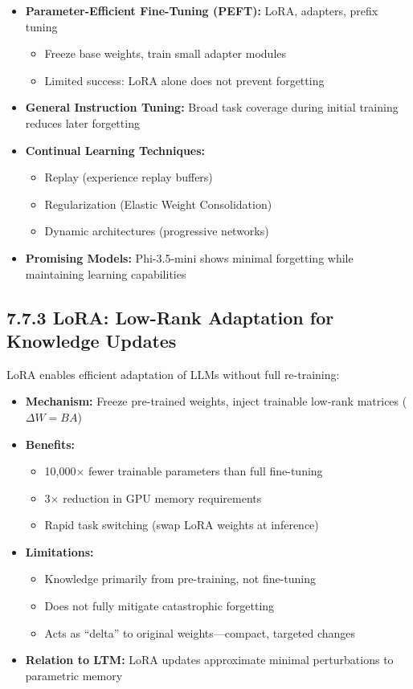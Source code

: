 \documentclass[11pt,letterpaper]{article}
\begin{document}
\begin{itemize}[leftmargin=*]
    \item \textbf{Parameter-Efficient Fine-Tuning (PEFT):} LoRA, adapters, prefix tuning
    \begin{itemize}
        \item Freeze base weights, train small adapter modules
        \item Limited success: LoRA alone does not prevent forgetting
    \end{itemize}
    \item \textbf{General Instruction Tuning:} Broad task coverage during initial training reduces later forgetting
    \item \textbf{Continual Learning Techniques:}
    \begin{itemize}
        \item Replay (experience replay buffers)
        \item Regularization (Elastic Weight Consolidation)
        \item Dynamic architectures (progressive networks)
    \end{itemize}
    \item \textbf{Promising Models:} Phi-3.5-mini shows minimal forgetting while maintaining learning capabilities
\end{itemize}

\subsection{7.7.3 LoRA: Low-Rank Adaptation for Knowledge Updates}

LoRA enables efficient adaptation of LLMs without full re-training:

\begin{itemize}[leftmargin=*]
    \item \textbf{Mechanism:} Freeze pre-trained weights, inject trainable low-rank matrices ($\Delta W = BA$)
    \item \textbf{Benefits:}
    \begin{itemize}
        \item 10,000× fewer trainable parameters than full fine-tuning
        \item 3× reduction in GPU memory requirements
        \item Rapid task switching (swap LoRA weights at inference)
    \end{itemize}
    \item \textbf{Limitations:}
    \begin{itemize}
        \item Knowledge primarily from pre-training, not fine-tuning
        \item Does not fully mitigate catastrophic forgetting
        \item Acts as ``delta'' to original weights—compact, targeted changes
    \end{itemize}
    \item \textbf{Relation to LTM:} LoRA updates approximate minimal perturbations to parametric memory
\end{itemize}
\end{document}
